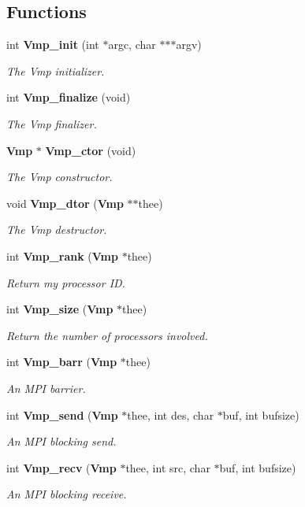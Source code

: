 \subsection*{Functions}
\begin{DoxyCompactItemize}
\item 
int {\bf Vmp\-\_\-init} (int $\ast$argc, char $\ast$$\ast$$\ast$argv)
\begin{DoxyCompactList}\small\item\em The Vmp initializer. \end{DoxyCompactList}\item 
int {\bf Vmp\-\_\-finalize} (void)
\begin{DoxyCompactList}\small\item\em The Vmp finalizer. \end{DoxyCompactList}\item 
{\bf Vmp} $\ast$ {\bf Vmp\-\_\-ctor} (void)
\begin{DoxyCompactList}\small\item\em The Vmp constructor. \end{DoxyCompactList}\item 
void {\bf Vmp\-\_\-dtor} ({\bf Vmp} $\ast$$\ast$thee)
\begin{DoxyCompactList}\small\item\em The Vmp destructor. \end{DoxyCompactList}\item 
int {\bf Vmp\-\_\-rank} ({\bf Vmp} $\ast$thee)
\begin{DoxyCompactList}\small\item\em Return my processor I\-D. \end{DoxyCompactList}\item 
int {\bf Vmp\-\_\-size} ({\bf Vmp} $\ast$thee)
\begin{DoxyCompactList}\small\item\em Return the number of processors involved. \end{DoxyCompactList}\item 
int {\bf Vmp\-\_\-barr} ({\bf Vmp} $\ast$thee)
\begin{DoxyCompactList}\small\item\em An M\-P\-I barrier. \end{DoxyCompactList}\item 
int {\bf Vmp\-\_\-send} ({\bf Vmp} $\ast$thee, int des, char $\ast$buf, int bufsize)
\begin{DoxyCompactList}\small\item\em An M\-P\-I blocking send. \end{DoxyCompactList}\item 
int {\bf Vmp\-\_\-recv} ({\bf Vmp} $\ast$thee, int src, char $\ast$buf, int bufsize)
\begin{DoxyCompactList}\small\item\em An M\-P\-I blocking receive. \end{DoxyCompactList}\end{DoxyCompactItemize}


